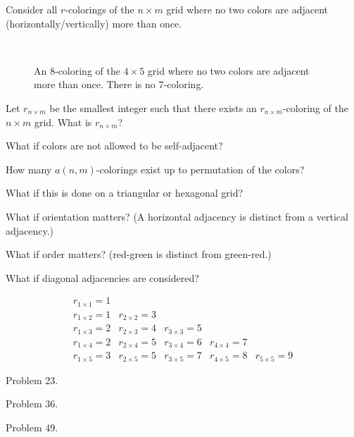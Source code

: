 \documentclass{article}
\begin{document}
Consider all $r$-colorings of the $n \times m$ grid where no two colors
are adjacent (horizontally/vertically) more than once.

\begin{figure}[!h]
  \centering
  \\
  \caption{An $8$-coloring of the $4 \times 5$ grid where no two colors are adjacent
    more than once. There is no $7$-coloring.}
\end{figure}

\begin{question}
  Let $r_{n\times m}$ be the smallest integer such that there exists an
  $r_{n \times m}$-coloring of the $n \times m$ grid. What is $r_{n\times m}$?
\end{question}
\begin{related}
  \item What if colors are not allowed to be self-adjacent?
  \item How many $a(n, m)$-colorings exist up to permutation of the colors?
  \item What if this is done on a triangular or hexagonal grid?
  \item What if orientation matters?
    (A horizontal adjacency is distinct from a vertical adjacency.)
  \item What if order matters? (red-green is distinct from green-red.)
  \item What if diagonal adjacencies are considered?
\end{related}

\begin{note}
  \[
    \begin{array}{ccccc}
      r_{1 \times 1} = 1 \\
      r_{1 \times 2} = 1 & r_{2 \times 2} = 3 \\
      r_{1 \times 3} = 2 & r_{2 \times 3} = 4 & r_{3 \times 3} = 5 \\
      r_{1 \times 4} = 2 & r_{2 \times 4} = 5 & r_{3 \times 4} = 6 & r_{4 \times 4} = 7 \\
      r_{1 \times 5} = 3 & r_{2 \times 5} = 5 & r_{3 \times 5} = 7 & r_{4 \times 5} = 8 & r_{5 \times 5} = 9
    \end{array}
  \]
\end{note}

\begin{references}
  \item Problem 23.
  \item Problem 36.
  \item Problem 49.
\end{references}
\end{document}
